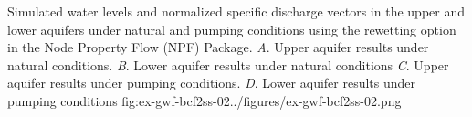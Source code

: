 \begin{StandardFigure}{
                                     Simulated water levels and normalized specific discharge vectors in 
                                     the upper and lower aquifers under natural and pumping conditions
                                     using the rewetting option in the Node Property Flow (NPF) Package.
                                     \textit{A}. Upper aquifer results under natural conditions.
                                     \textit{B}. Lower aquifer results under natural conditions
                                     \textit{C}. Upper aquifer results under pumping conditions.
                                     \textit{D}. Lower aquifer results under pumping conditions
                                     }{fig:ex-gwf-bcf2ss-02}{../figures/ex-gwf-bcf2ss-02.png}
\end{StandardFigure}                                 

